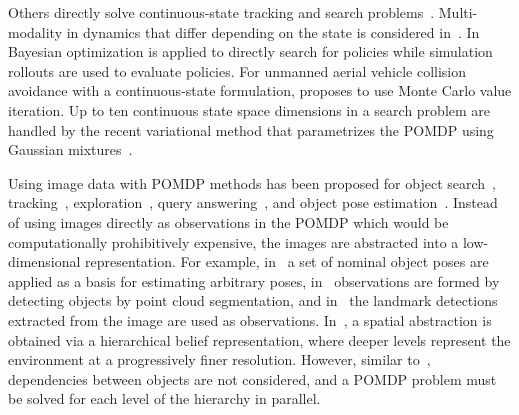 \documentclass[journal]{IEEEtran}
\begin{document}
Others directly solve continuous-state tracking and search problems~\cite{brunskill2008continuous,martinez2009bayesian,bai2012unmanned,burks2019optimal}.
Multi-modality in dynamics that differ depending on the state is considered in~\cite{brunskill2008continuous}.
In~\cite{martinez2009bayesian} Bayesian optimization is applied to directly search for policies while simulation rollouts are used to evaluate policies.
For unmanned aerial vehicle collision avoidance with a continuous-state formulation, \cite{bai2012unmanned} proposes to use Monte Carlo value iteration.
Up to ten continuous state space dimensions in a search problem are handled by the recent variational method that parametrizes the POMDP using Gaussian mixtures~\cite{burks2019optimal}.

{Using} image data with POMDP methods has been proposed for object search~\cite{zhang2013active,wandzel2019multi,xiao2019online,wang2020pomp,zheng2021}, tracking~\cite{spaan2010active}, exploration~\cite{martinez2009bayesian,valimaki2016optimizing}, query answering~\cite{sridharan2010planning}, and object pose estimation~\cite{eidenberger2010active,atanasov2014nonmyopic}.
Instead of using images directly as observations in the POMDP which would be computationally prohibitively expensive, the images are abstracted into a low-dimensional representation.
For example, in~\cite{atanasov2014nonmyopic} a set of nominal object poses are applied as a basis for estimating arbitrary poses, in~\cite{xiao2019online} observations are formed by detecting objects by point cloud segmentation, and in~\cite{martinez2009bayesian} the landmark detections extracted from the image are used as observations.
{In~\cite{zheng2021}, a spatial abstraction is obtained via a hierarchical belief representation, where deeper levels represent the environment at a progressively finer resolution.
%
However, similar to~\cite{wandzel2019multi}, dependencies between objects are not considered, and a POMDP problem must be solved for each level of the hierarchy in parallel.
}
\end{document}
